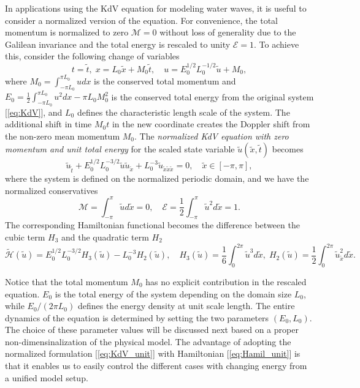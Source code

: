 \documentclass[9pt,twoside,lineno]{pnas-new}
\theoremstyle{plain}
\theoremstyle{plain}
\begin{document}
In applications using the KdV equation for modeling water waves, it
is useful to consider a normalized version of the equation. For convenience,
the total momentum is normalized to zero $\mathcal{M}=0$ without
loss of generality due to the Galilean invariance and the total energy
is rescaled to unity $\mathcal{E}=1$. To achieve this, consider the
following change of variables
\[
t=\tilde{t},\;x=L_{0}\tilde{x}+M_{0}\tilde{t},\quad u=E_{0}^{1/2}L_{0}^{-1/2}\tilde{u}+M_{0},
\]
where $M_{0}=\int_{-\pi L_{0}}^{\pi L_{0}}udx$ is the conserved total
momentum and $E_{0}=\frac{1}{2}\int_{-\pi L_{0}}^{\pi L_{0}}u^{2}dx-\pi L_{0}M_{0}^{2}$
is the conserved total energy from the original system [\ref{eq:KdV}],
and $L_{0}$ defines the characteristic length scale of the system.
The additional shift in time $M_{0}t$ in the new coordinate creates
the Doppler shift from the non-zero mean momentum $M_{0}$. The \emph{normalized
KdV equation with zero momentum and unit total energy} for the scaled
state variable $\tilde{u}\left(\tilde{x},\tilde{t}\right)$ becomes
\begin{equation}
\tilde{u}_{\tilde{t}}+E_{0}^{1/2}L_{0}^{-3/2}\tilde{u}\tilde{u}_{\tilde{x}}+L_{0}^{-3}\tilde{u}_{\tilde{x}\tilde{x}\tilde{x}}=0,\quad\tilde{x}\in\left[-\pi,\pi\right],\label{eq:KdV_unit}
\end{equation}
where the system is defined on the normalized periodic domain, and
we have the normalized conservatives 
\[
\mathcal{M}=\int_{-\pi}^{\pi}\tilde{u}d\tilde{x}=0,\quad\mathcal{E}=\frac{1}{2}\int_{-\pi}^{\pi}\tilde{u}^{2}d\tilde{x}=1.
\]
The corresponding Hamiltonian functional becomes the difference between
the cubic term $H_{3}$ and the quadratic term $H_{2}$
\begin{equation}
\tilde{\mathcal{H}}\left(\tilde{u}\right)=E_{0}^{1/2}L_{0}^{-3/2}H_{3}\left(\tilde{u}\right)-L_{0}^{-3}H_{2}\left(\tilde{u}\right),\quad H_{3}\left(\tilde{u}\right)=\frac{1}{6}\int_{0}^{2\pi}\tilde{u}^{3}d\tilde{x},\;H_{2}\left(\tilde{u}\right)=\frac{1}{2}\int_{0}^{2\pi}\tilde{u}_{\tilde{x}}^{2}d\tilde{x}.\label{eq:Hamil_unit}
\end{equation}

Notice that the total momentum $M_{0}$ has no explicit contribution
in the rescaled equation. $E_{0}$ is the total energy of the system
depending on the domain size $L_{0}$, while $E_{0}/\left(2\pi L_{0}\right)$
defines the energy density at unit scale length. The entire dynamics
of the equation is determined by setting the two parameters $\left(E_{0},L_{0}\right)$.
The choice of these parameter values will be discussed next based
on a proper non-dimensinalization of the physical model. The advantage
of adopting the normalized formulation [\ref{eq:KdV_unit}] with Hamiltonian
[\ref{eq:Hamil_unit}] is that it enables us to easily control the
different cases with changing energy from a unified model setup.
\end{document}
